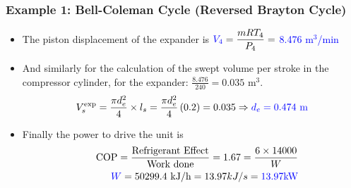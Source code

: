 \documentclass[10pt,compress]{beamer}
\newcommand{\frc}{\displaystyle\frac}
\begin{document}
\begin{frame}
 \frametitle{Example 1: Bell-Coleman Cycle (Reversed Brayton Cycle)}
  \begin{itemize}
   \item <1-> The piston displacement of the expander is $\textcolor{blue}{V_{4}}=\frc{m R T_{4}}{P_{4}} =$ \textcolor{blue}{8.476 m$^{3}$/min}
   \item <2-> And similarly for the  calculation of the swept volume per stroke in the compressor cylinder, for the expander: $\frc{8.476}{240}=0.035$ m$^{3}$.
     \begin{displaymath}
      V_{s}^{\text{exp}}= \frc{\pi d_{e}^{2}}{4}\times l_{s} = \frc{\pi d_{e}^{2}}{4}\left(0.2\right) = 0.035 \Rightarrow \textcolor{blue}{d_{e} = 0.474\text{ m}}
     \end{displaymath}
   \item <3-> Finally the power to drive the unit is
     \begin{eqnarray}
      && \text{COP}=\frc{\text{Refrigerant Effect}}{\text{Work done}} = 1.67 = \frc{ 6 \times 14000}{W} \nonumber \\
      &&\textcolor{blue}{W} = 50299.4 \text{ kJ/h} = 13.97 kJ/s = \textcolor{blue}{13.97 \text{kW}} \nonumber 
     \end{eqnarray}

  \end{itemize}

\end{frame}
\end{document}

